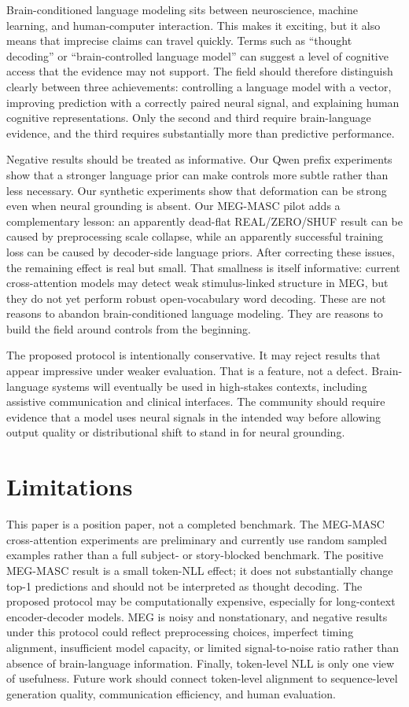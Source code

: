 \documentclass{article}
\begin{document}
Brain-conditioned language modeling sits between neuroscience, machine learning, and human-computer interaction.
This makes it exciting, but it also means that imprecise claims can travel quickly.
Terms such as ``thought decoding'' or ``brain-controlled language model'' can suggest a level of cognitive access that the evidence may not support.
The field should therefore distinguish clearly between three achievements: controlling a language model with a vector, improving prediction with a correctly paired neural signal, and explaining human cognitive representations.
Only the second and third require brain-language evidence, and the third requires substantially more than predictive performance.

Negative results should be treated as informative.
Our Qwen prefix experiments show that a stronger language prior can make controls more subtle rather than less necessary.
Our synthetic experiments show that deformation can be strong even when neural grounding is absent.
Our MEG-MASC pilot adds a complementary lesson: an apparently dead-flat REAL/ZERO/SHUF result can be caused by preprocessing scale collapse, while an apparently successful training loss can be caused by decoder-side language priors.
After correcting these issues, the remaining effect is real but small.
That smallness is itself informative: current cross-attention models may detect weak stimulus-linked structure in MEG, but they do not yet perform robust open-vocabulary word decoding.
These are not reasons to abandon brain-conditioned language modeling.
They are reasons to build the field around controls from the beginning.

The proposed protocol is intentionally conservative.
It may reject results that appear impressive under weaker evaluation.
That is a feature, not a defect.
Brain-language systems will eventually be used in high-stakes contexts, including assistive communication and clinical interfaces.
The community should require evidence that a model uses neural signals in the intended way before allowing output quality or distributional shift to stand in for neural grounding.

\section{Limitations}

This paper is a position paper, not a completed benchmark.
The MEG-MASC cross-attention experiments are preliminary and currently use random sampled examples rather than a full subject- or story-blocked benchmark.
The positive MEG-MASC result is a small token-NLL effect; it does not substantially change top-1 predictions and should not be interpreted as thought decoding.
The proposed protocol may be computationally expensive, especially for long-context encoder-decoder models.
MEG is noisy and nonstationary, and negative results under this protocol could reflect preprocessing choices, imperfect timing alignment, insufficient model capacity, or limited signal-to-noise ratio rather than absence of brain-language information.
Finally, token-level NLL is only one view of usefulness.
Future work should connect token-level alignment to sequence-level generation quality, communication efficiency, and human evaluation.
\end{document}
